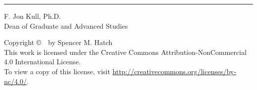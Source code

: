 \begin{titlepage}
\begin{minipage}[b]{\linewidth}
    \begin{flushleft}
        \vspace*{-0.44in}
        \singlespacing
        \begin{minipage}[b]{0.45\linewidth}
            \hrule \vspace{0.1in}
            F. Jon Kull, Ph.D. \\              %
            Dean of Graduate and Advanced Studies
        \end{minipage}
    \end{flushleft}
    
 \end{minipage}
 
\end{titlepage}


\newpage
\thispagestyle{empty}
\begin{center}
    \vspace*{\fill}
    Copyright \copyright\ \the\year\ by Spencer M. Hatch \\ 
    This work is licensed under the Creative Commons Attribution-NonCommercial 4.0 International License. \\
    To view a copy of this license, visit \url{http://creativecommons.org/licenses/by-nc/4.0/}.
    \vspace*{\fill}
\end{center}

\newpage


\newpage
{}


{
    \newpage
    \hypersetup{linkcolor=black}
    \tableofcontents
    
    \newpage
    \listoftables

    \newpage
    \listoffigures
}

